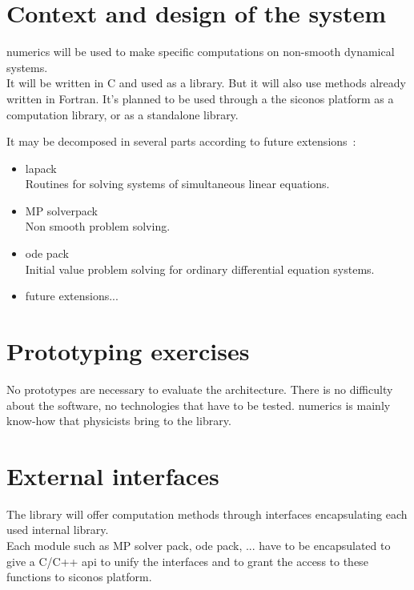 \section{Context and design of the system}
\ac{numerics} will be used to make specific computations on non-smooth dynamical systems.\\

It will be written in C and used as a library. But it will also use methods already written in Fortran.
It's planned to be used through a the \ac{siconos} platform as a computation library, or as a standalone library.

It may be decomposed in several parts according to future extensions~:
  \begin{itemize}
  	\item \ac{lapack}\\
		Routines for solving systems of simultaneous linear equations.
    \item MP solverpack\\
		Non smooth problem solving.
    \item \ac{ode} pack\\
		Initial value problem solving for ordinary differential equation systems.
	\item future extensions...\\
  \end{itemize}
  
  

\section{Prototyping exercises}
No prototypes are necessary to evaluate the architecture. There is no difficulty about the software, no technologies that have to be tested. \ac{numerics} is mainly know-how that physicists bring to the library.


\section{External interfaces}
The library will offer computation methods through interfaces encapsulating each used internal library.\\
Each module such as MP solver pack, \ac{ode} pack, ... have to be encapsulated to give a C/C++ \ac{api} to unify the interfaces and to grant the access to these functions to \ac{siconos} platform.

